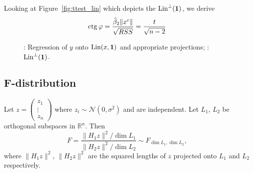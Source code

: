 Looking at Figure~\ref{fig:ttest_lin} which depicts the $\operatorname{Lin}^{\perp}(\mathbf{1})$,
we derive
\[
\operatorname{ctg} \varphi = \frac{\hat \beta_2 \lVert x^c \rVert}{\sqrt{RSS}} = \frac{t}{\sqrt{n-2}}
\]

\begin{figure}[ht!]
\begin{center}
\caption{: Regression of $y$ onto $\operatorname{Lin}(x, \mathbf{1})$ and appropriate projections;
: $\operatorname{Lin}^{\perp}(\mathbf{1})$.}
\end{center}
\end{figure}


\subsection{F-distribution}


\begin{definition}\label{def:f}
Let $z = \begin{pmatrix} z_1 \\ \vdots \\ z_n \end{pmatrix}$
where $z_i \sim \mathcal{N}(0, \sigma^2)$ and are independent.
Let $L_1$, $L_2$ be orthogonal subspaces in $\mathbb{R}^n$.
Then
\[
F = \frac{\lVert H_1 z \rVert^2 / \dim L_1}{\lVert H_2 z \rVert^2 / \dim L_2} \sim F_{\dim L_1, \dim L_2},
\]
where $\lVert H_1 z \rVert^2$, $\lVert H_2 z \rVert^2$ are the squared lengths
of $z$ projected onto $L_1$ and $L_2$ respectively.
\end{definition}

